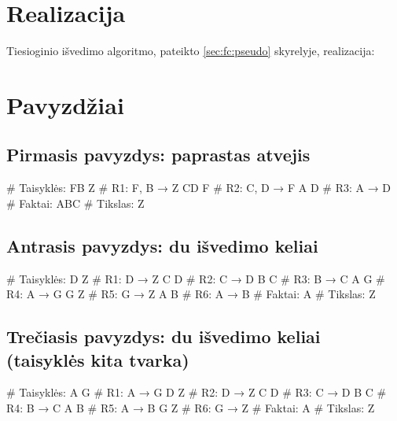 \section{Realizacija}

Tiesioginio išvedimo algoritmo, pateikto \ref{sec:fc:pseudo}
skyrelyje, realizacija:


\section{Pavyzdžiai}

\subsection{Pirmasis pavyzdys: paprastas atvejis}

\begin{pythonaienv}[fc]
# Taisyklės:
FB Z                                    # R1: F, B → Z
CD F                                    # R2: C, D → F
A D                                     # R3: A → D
# Faktai:
ABC
# Tikslas:
Z
\end{pythonaienv}

\subsection{Antrasis pavyzdys: du išvedimo keliai}

\begin{pythonaienv}[fc]
# Taisyklės:
D Z                                     # R1: D → Z
C D                                     # R2: C → D
B C                                     # R3: B → C
A G                                     # R4: A → G
G Z                                     # R5: G → Z
A B                                     # R6: A → B
# Faktai:
A
# Tikslas:
Z
\end{pythonaienv}

\subsection{Trečiasis pavyzdys: du išvedimo keliai (taisyklės kita tvarka)}

\begin{pythonaienv}[fc]
# Taisyklės:
A G                                     # R1: A → G
D Z                                     # R2: D → Z
C D                                     # R3: C → D
B C                                     # R4: B → C
A B                                     # R5: A → B
G Z                                     # R6: G → Z
# Faktai:
A
# Tikslas:
Z
\end{pythonaienv}

